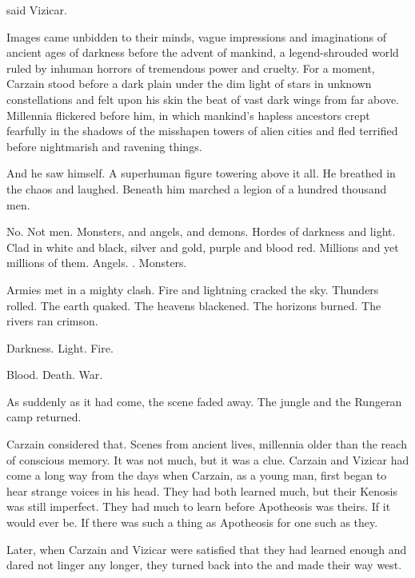 
 said Vizicar. 

Images came unbidden to their minds, vague impressions and imaginations of ancient ages of darkness before the advent of mankind, a legend-shrouded world ruled by inhuman horrors of tremendous power and cruelty. 
For a moment, Carzain stood before a dark plain under the dim light of stars in unknown constellations and felt upon his skin the beat of vast dark wings from far above. 
Millennia flickered before him, in which mankind's hapless ancestors crept fearfully in the shadows of the misshapen towers of alien cities and fled terrified before nightmarish and ravening things. 

And he saw himself. 
A superhuman figure towering above it all. 
He breathed in the chaos and laughed. 
Beneath him marched a legion of a hundred thousand men. 

No. 
Not men. 
Monsters, and angels, and demons. 
Hordes of darkness and light.  
Clad in white and black, silver and gold, purple and blood red. 
Millions and yet millions of them. 
Angels. 
\Dragons. 
Monsters. 

Armies met in a mighty clash. 
Fire and lightning cracked the sky. 
Thunders rolled. 
The earth quaked. 
The heavens blackened. 
The horizons burned. 
The rivers ran crimson. 

Darkness. 
Light. 
Fire. 

Blood. 
Death. 
War. 


As suddenly as it had come, the scene faded away. 
The jungle and the Rungeran camp returned. 





Carzain considered that. 
Scenes from ancient lives, millennia older than the reach of conscious memory. 
It was not much, but it was a clue. 
Carzain and Vizicar had come a long way from the days when Carzain, as a young man, first began to hear strange voices in his head. 
They had both learned much, but their Kenosis was still imperfect. 
They had much to learn before Apotheosis was theirs. 
If it would ever be. 
If there was such a thing as Apotheosis for one such as they. 

Later, when Carzain and Vizicar were satisfied that they had learned enough and dared not linger any longer, they turned back into the \wylde and made their way west. 








